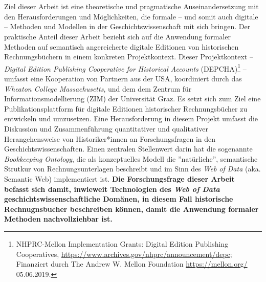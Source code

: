 \documentclass[12pt,a4paper]{article}
\begin{document}
\\
\\
Ziel dieser Arbeit ist eine theoretische und pragmatische Auseinandersetzung mit den Herausforderungen und Möglichkeiten, die formale -- und somit auch digitale -- Methoden und Modellen in der Geschichtswissenschaft mit sich bringen. Der praktische Anteil dieser Arbeit bezieht sich auf die Anwendung formaler Methoden auf semantisch angereicherte digitale Editionen von historischen Rechnungsbüchern in einem konkreten Projektkontext. Dieser Projektkontext -- \textit{Digital Edition Publishing Cooperative for Historical Accounts} (DEPCHA)\footnote{NHPRC-Mellon Implementation Grants: Digital Edition Publishing Cooperatives, \url{https://www.archives.gov/nhprc/announcement/depc}; Finanziert durch The Andrew W. Mellon Foundation \url{https://mellon.org/} 05.06.2019.} -- umfasst eine Kooperation von Partnern aus der USA, koordiniert durch das \textit{Wheaton College Massachusetts}, und dem dem Zentrum für Informationsmodellierung (ZIM) der Universität Graz. Es setzt sich zum Ziel eine Publikationsplattform für digitale Editionen historischer Rechnungsbücher zu entwickeln und umzusetzen. Eine Herausforderung in diesem Projekt umfasst die Diskussion und Zusammenführung quantitativer und qualitativer Herangehensweise  von Historiker*innen an Forschungsfragen in den Geschichtswissenschaften. Einen zentralen Stellenwert darin hat die sogenannte \textit{Bookkeeping Ontology}, die als konzeptuelles Modell die ''natürliche'', semantische Strutkur von Rechnungsunterlagen beschreibt und im Sinn des \textit{Web of Data} (aka. Semantic Web) implementiert ist. \textbf{Die Forschungsfrage dieser Arbeit befasst sich damit, inwieweit Technologien des \textit{Web of Data} geschichtswissenschaftliche Domänen, in diesem Fall historische Rechnugnsbucher beschreiben können, damit die Anwendung formaler Methoden nachvollziehbar ist.} 
\end{document}
